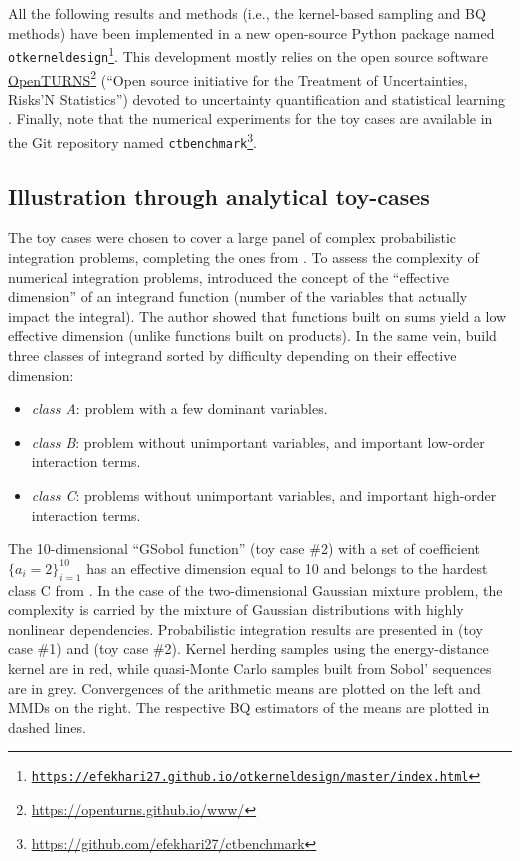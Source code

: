 All the following results and methods (i.e., the kernel-based sampling and BQ methods) have been implemented in a new open-source Python package named \texttt{otkerneldesign\footnote{\href{https://efekhari27.github.io/otkerneldesign/master/index.html}{https://efekhari27.github.io/otkerneldesign/master/index.html}}}. 
This development mostly relies on the open source software \href{https://openturns.github.io/www/}{OpenTURNS}\footnote{\url{https://openturns.github.io/www/}} (``Open source initiative for the Treatment of Uncertainties, Risks'N Statistics'') devoted to uncertainty quantification and statistical learning \citep{baudin_dutfoy_2017}. 
Finally, note that the numerical experiments for the toy cases are available in the Git repository named \texttt{ctbenchmark}\footnote{\href{https://github.com/efekhari27/ctbenchmark}{https://github.com/efekhari27/ctbenchmark}}. 


\subsection{Illustration through analytical toy-cases}
The toy cases were chosen to cover a large panel of complex probabilistic integration problems, completing the ones from \cite{fekhari_renew_2022}.
To assess the complexity of numerical integration problems, \cite{owen_2003} introduced the concept of the ``effective dimension'' of an integrand function (number of the variables that actually impact the integral). 
The author showed that functions built on sums yield a low effective dimension (unlike functions built on products). 
In the same vein, \cite{kucherenko_feil_2011} build three classes of integrand sorted by difficulty depending on their effective dimension: \begin{itemize}
    \item \emph{class A}: problem with a few dominant variables.
    \item \emph{class B}: problem without unimportant variables, and important low-order interaction terms.
    \item \emph{class C}: problems without unimportant variables, and important high-order interaction terms. 
\end{itemize}
The 10-dimensional ``GSobol function'' (toy case \#2) with a set of coefficient $\{a_i=2\}_{i=1}^{10}$ has an effective dimension equal to 10 and belongs to the hardest class C from \cite{kucherenko_feil_2011}. 
In the case of the two-dimensional Gaussian mixture problem, the complexity is carried by the mixture of Gaussian distributions with highly nonlinear dependencies.
Probabilistic integration results are presented in  (toy case \#1) and  (toy case \#2). 
Kernel herding samples using the energy-distance kernel are in red, while quasi-Monte Carlo samples built from Sobol' sequences are in grey. 
Convergences of the arithmetic means are plotted on the left and MMDs on the right. 
The respective BQ estimators of the means are plotted in dashed lines. 

